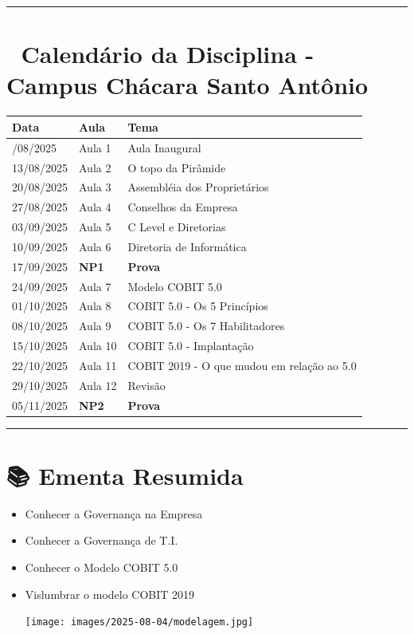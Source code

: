 \documentclass[
]{book}
\begin{document}
\begin{center}\rule{0.5\linewidth}{0.5pt}\end{center}

\section{📅 Calendário da Disciplina - Campus Chácara Santo Antônio}\label{calenduxe1rio-da-disciplina---campus-chuxe1cara-santo-antuxf4nio}

\begin{longtable}[]{@{}lll@{}}
\toprule\noalign{}
Data & Aula & Tema \\
\midrule\noalign{}
\endhead
\bottomrule\noalign{}
\endlastfoot
06/08/2025 & Aula 1 & Aula Inaugural \\
13/08/2025 & Aula 2 & O topo da Pirâmide \\
20/08/2025 & Aula 3 & Assembléia dos Proprietários \\
27/08/2025 & Aula 4 & Conselhos da Empresa \\
03/09/2025 & Aula 5 & C Level e Diretorias \\
10/09/2025 & Aula 6 & Diretoria de Informática \\
17/09/2025 & \textbf{NP1} & \textbf{Prova} \\
24/09/2025 & Aula 7 & Modelo COBIT 5.0 \\
01/10/2025 & Aula 8 & COBIT 5.0 - Os 5 Princípios \\
08/10/2025 & Aula 9 & COBIT 5.0 - Os 7 Habilitadores \\
15/10/2025 & Aula 10 & COBIT 5.0 - Implantação \\
22/10/2025 & Aula 11 & COBIT 2019 - O que mudou em relação ao 5.0 \\
29/10/2025 & Aula 12 & Revisão \\
05/11/2025 & \textbf{NP2} & \textbf{Prova} \\
\end{longtable}

\begin{center}\rule{0.5\linewidth}{0.5pt}\end{center}

\section{📚 Ementa Resumida}\label{ementa-resumida}

\begin{itemize}
\item
  Conhecer a Governança na Empresa
\item
  Conhecer a Governança de T.I.
\item
  Conhecer o Modelo COBIT 5.0
\item
  Vislumbrar o modelo COBIT 2019

  \texttt{[image: images/2025-08-04/modelagem.jpg]}
\end{itemize}
\end{document}
